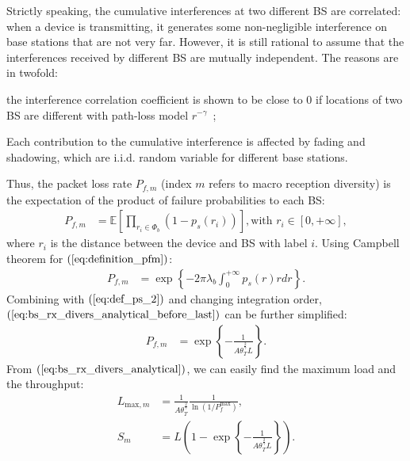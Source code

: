 Strictly speaking, the cumulative interferences at two different BS are correlated: when a device is transmitting, it generates some non-negligible interference on base stations that are not very far. However, it is still rational to assume that the interferences received by different BS are mutually independent.
The reasons are in twofold:\begin{inparaenum}[1)]
	\item the interference correlation coefficient is shown to be close to $0$ if locations of two BS are different with path-loss model $r^{-\gamma}$~\cite[lemma 3.5]{haenggi2009interference}; 
	\item Each contribution to the cumulative interference is affected by fading and shadowing, which are i.i.d. random variable for different base stations.
\end{inparaenum}
Thus, the packet loss rate $P_{f,m}$ (index $m$ refers to macro reception diversity) is the expectation of the product of failure probabilities to each BS:
\begin{align}
\label{eq:definition_pfm}
P_{f,m} &= \mathbb{E}\left[  \prod_{r_i \in \Phi_{b}} (1-p_{s}(r_i)) \right], \text{with } r_i \in \left[0, +\infty\right],
\end{align} 
where $r_i$ is the distance between the device and BS with label $i$. Using Campbell theorem for  $(\ref{eq:definition_pfm})$:
\begin{align}
\label{eq:bs_rx_divers_analytical_before_last}
P_{f,m} &= \exp\left\lbrace -2\pi \lambda_{b} \int_{0}^{+\infty} p_{s}(r)rdr \right\rbrace.
\end{align} 
Combining with $(\ref{eq:def_ps_2})$ and changing integration order, $(\ref{eq:bs_rx_divers_analytical_before_last})$ can be further simplified:
\begin{align}
\label{eq:bs_rx_divers_analytical}
P_{f,m} 
&= \exp\left\lbrace -\frac{1}{A \theta_{T}^{\frac{2}{\gamma}} L }\right\rbrace.
\end{align}
From $(\ref{eq:bs_rx_divers_analytical})$, we can easily find the maximum load and the throughput:
\begin{align}
	\label{eq:bs_rx_divers_max_load}
	L_{\text{max}, m} &= \frac{1}{A \theta_{T}^{\frac{2}{\gamma}}} \frac{1}{\ln(1/P_{f}^{\text{max}})}, \\
	\label{eq:bs_rx_divers_spatial_throughput}
	S_{m} &= L \left(1 -\exp\left\lbrace -\frac{1}{A \theta_{T}^{\frac{2}{\gamma}} L } \right\rbrace \right). 
\end{align}
